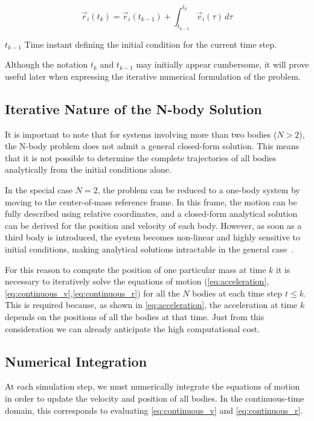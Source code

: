 \documentclass{article}
\begin{document}
\begin{equation}
\vec{r}_i(t_k) = \vec{r}_i(t_{k-1}) + \int_{t_{k-1}}^{t_k} \vec{v}_i(\tau)\, d\tau
\label{eq:continuous_r}
\end{equation}
\begin{description}
\item $t_{k-1}$ Time instant defining the initial condition for the current time step.
\end{description}
Although the notation $t_k$ and $t_{k-1}$ may initially appear cumbersome, it will prove useful later when expressing the iterative numerical formulation of the problem.
\subsection{Iterative Nature of the N-body Solution}
It is important to note that for systems involving more than two bodies (\( N > 2 \)), the N-body problem does not admit a general closed-form solution. This means that it is not possible to determine the complete trajectories of all bodies analytically from the initial conditions alone.

In the special case \( N = 2 \), the problem can be reduced to a one-body system by moving to the center-of-mass reference frame. In this frame, the motion can be fully described using relative coordinates, and a closed-form analytical solution can be derived for the position and velocity of each body. However, as soon as a third body is introduced, the system becomes non-linear and highly sensitive to initial conditions, making analytical solutions intractable in the general case~\cite{heggie2005classical}.

For this reason to compute the position of one particular mass at time $k$ it is necessary to iteratively solve the equations of motion (\eqref{eq:acceleration},\eqref{eq:continuous_v},\eqref{eq:continuous_r}) for all the $N$ bodies at each time step $t \leq k$. This is required because, as shown in \eqref{eq:acceleration}, the acceleration at time $k$ depends on the positions of all the bodies at that time.
Just from this consideration we can already anticipate the high computational cost.

\subsection{Numerical Integration}
\label{subsec:num_int}
At each simulation step, we must numerically integrate the equations of motion in order to update the velocity and position of all bodies. In the continuous-time domain, this corresponds to evaluating \eqref{eq:continuous_v} and \eqref{eq:continuous_r}.
\end{document}
